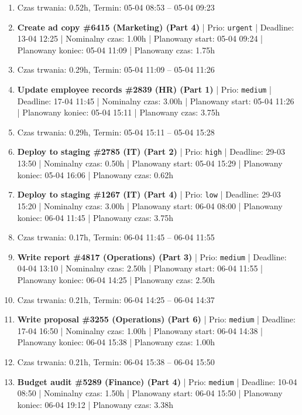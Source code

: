 {\begin{enumerate}
  \item [\textbf{PRZERWA}] Czas trwania: 0.52h, Termin: 05-04 08:53 -- 05-04 09:23
  \item [\textbf{14602}] \textbf{Create ad copy \#6415 (Marketing) (Part 4)} | Prio: \texttt{urgent} | Deadline: 13-04 12:25 | Nominalny czas: 1.00h | Planowany start: 05-04 09:24 | Planowany koniec: 05-04 11:09 | Planowany czas: 1.75h
  \item [\textbf{PRZERWA}] Czas trwania: 0.29h, Termin: 05-04 11:09 -- 05-04 11:26
  \item [\textbf{14670}] \textbf{Update employee records \#2839 (HR) (Part 1)} | Prio: \texttt{medium} | Deadline: 17-04 11:45 | Nominalny czas: 3.00h | Planowany start: 05-04 11:26 | Planowany koniec: 05-04 15:11 | Planowany czas: 3.75h
  \item [\textbf{PRZERWA}] Czas trwania: 0.29h, Termin: 05-04 15:11 -- 05-04 15:28
  \item [\textbf{14623}] \textbf{Deploy to staging \#2785 (IT) (Part 2)} | Prio: \texttt{high} | Deadline: 29-03 13:50 | Nominalny czas: 0.50h | Planowany start: 05-04 15:29 | Planowany koniec: 05-04 16:06 | Planowany czas: 0.62h
  \item [\textbf{14686}] \textbf{Deploy to staging \#1267 (IT) (Part 4)} | Prio: \texttt{low} | Deadline: 29-03 15:20 | Nominalny czas: 3.00h | Planowany start: 06-04 08:00 | Planowany koniec: 06-04 11:45 | Planowany czas: 3.75h
  \item [\textbf{PRZERWA}] Czas trwania: 0.17h, Termin: 06-04 11:45 -- 06-04 11:55
  \item [\textbf{14639}] \textbf{Write report \#4817 (Operations) (Part 3)} | Prio: \texttt{medium} | Deadline: 04-04 13:10 | Nominalny czas: 2.50h | Planowany start: 06-04 11:55 | Planowany koniec: 06-04 14:25 | Planowany czas: 2.50h
  \item [\textbf{PRZERWA}] Czas trwania: 0.21h, Termin: 06-04 14:25 -- 06-04 14:37
  \item [\textbf{14654}] \textbf{Write proposal \#3255 (Operations) (Part 6)} | Prio: \texttt{medium} | Deadline: 17-04 16:50 | Nominalny czas: 1.00h | Planowany start: 06-04 14:38 | Planowany koniec: 06-04 15:38 | Planowany czas: 1.00h
  \item [\textbf{PRZERWA}] Czas trwania: 0.21h, Termin: 06-04 15:38 -- 06-04 15:50
  \item [\textbf{14630}] \textbf{Budget audit \#5289 (Finance) (Part 4)} | Prio: \texttt{medium} | Deadline: 10-04 08:50 | Nominalny czas: 1.50h | Planowany start: 06-04 15:50 | Planowany koniec: 06-04 19:12 | Planowany czas: 3.38h

\end{enumerate}}
